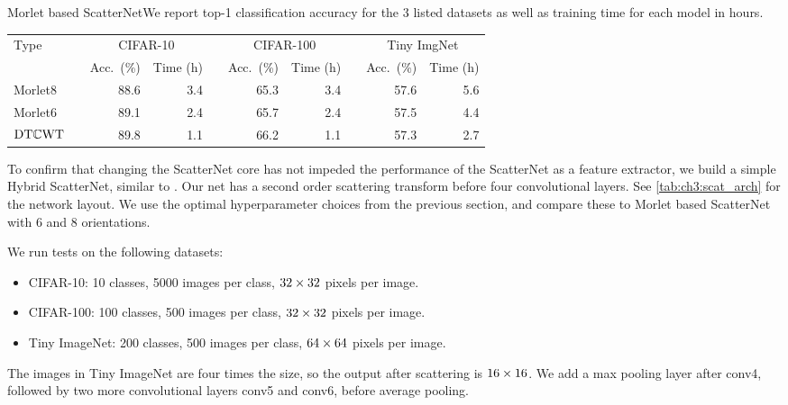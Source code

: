 \begin{table}[ht]
{  Morlet based ScatterNet}{We report top-1 classification accuracy for the 3
  listed datasets as well as training time for each model in hours.}
  \label{tab:ch3:comparison}
  \begin{tabular}{lcrrcrrcrr}
    \toprule
    Type & \phantom{abc} & \multicolumn{2}{c}{CIFAR-10} && \multicolumn{2}{c}{CIFAR-100}
         && \multicolumn{2}{c}{Tiny ImgNet} \\\cmidrule{3-4}\cmidrule{6-7}\cmidrule{9-10}
         && Acc.\ (\%) & Time (h) && Acc.\ (\%) & Time (h) && Acc.\ (\%) & Time (h)\\\midrule
    Morlet8 && 88.6 & 3.4 && 65.3 & 3.4 && 57.6 & 5.6 \\
    Morlet6 && 89.1 & 2.4 && 65.7 & 2.4 && 57.5 & 4.4 \\
    $\mathrm{DT}\mathbb{C}\mathrm{WT}$ && 89.8 & 1.1 && 66.2 & 1.1 && 57.3 & 2.7 \\\bottomrule
  \end{tabular}
\end{table}
To confirm that changing the ScatterNet core has not impeded the
performance of the ScatterNet as a feature extractor, we build a simple Hybrid
ScatterNet, similar to \cite{oyallon_scaling_2017}. Our net 
has a second order scattering transform before four convolutional layers. See \autoref{tab:ch3:scat_arch}
for the network layout.
We use the optimal hyperparameter choices from the previous section, and compare
these to Morlet based ScatterNet with 6 and 8 orientations.

We run tests on the following datasets:
\begin{itemize}
  \item CIFAR-10: 10 classes, 5000 images per class, $32\times 32$ pixels per image.
  \item CIFAR-100: 100 classes, 500 images per class, $32\times 32$ pixels per image.
  \item Tiny ImageNet\cite{li_tiny_2017}: 200 classes, 500 images per class,
    $64 \times 64$ pixels per image.
\end{itemize}

The images in Tiny ImageNet are four times the size, so the output after
scattering is $16\times 16$. We add a max pooling layer after conv4, followed
by two more convolutional layers conv5 and conv6, before average pooling.

